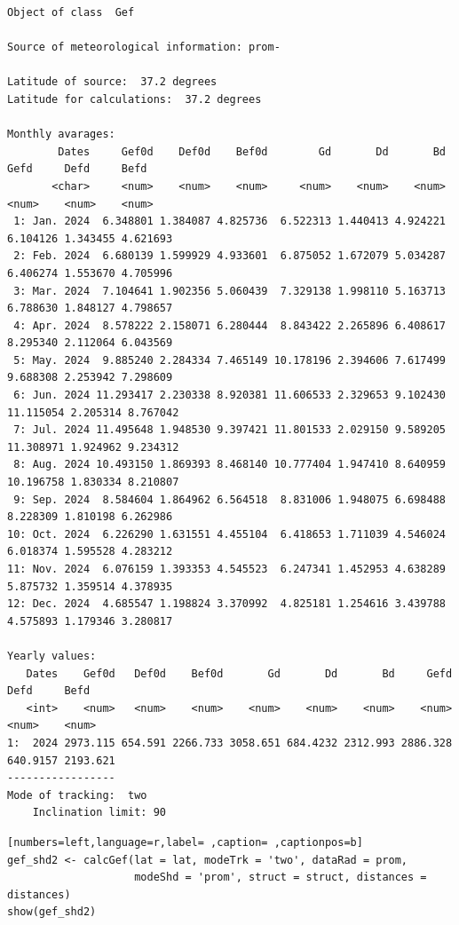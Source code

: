 \begin{verbatim}
Object of class  Gef 

Source of meteorological information: prom- 

Latitude of source:  37.2 degrees
Latitude for calculations:  37.2 degrees

Monthly avarages:
        Dates     Gef0d    Def0d    Bef0d        Gd       Dd       Bd      Gefd     Defd     Befd
       <char>     <num>    <num>    <num>     <num>    <num>    <num>     <num>    <num>    <num>
 1: Jan. 2024  6.348801 1.384087 4.825736  6.522313 1.440413 4.924221  6.104126 1.343455 4.621693
 2: Feb. 2024  6.680139 1.599929 4.933601  6.875052 1.672079 5.034287  6.406274 1.553670 4.705996
 3: Mar. 2024  7.104641 1.902356 5.060439  7.329138 1.998110 5.163713  6.788630 1.848127 4.798657
 4: Apr. 2024  8.578222 2.158071 6.280444  8.843422 2.265896 6.408617  8.295340 2.112064 6.043569
 5: May. 2024  9.885240 2.284334 7.465149 10.178196 2.394606 7.617499  9.688308 2.253942 7.298609
 6: Jun. 2024 11.293417 2.230338 8.920381 11.606533 2.329653 9.102430 11.115054 2.205314 8.767042
 7: Jul. 2024 11.495648 1.948530 9.397421 11.801533 2.029150 9.589205 11.308971 1.924962 9.234312
 8: Aug. 2024 10.493150 1.869393 8.468140 10.777404 1.947410 8.640959 10.196758 1.830334 8.210807
 9: Sep. 2024  8.584604 1.864962 6.564518  8.831006 1.948075 6.698488  8.228309 1.810198 6.262986
10: Oct. 2024  6.226290 1.631551 4.455104  6.418653 1.711039 4.546024  6.018374 1.595528 4.283212
11: Nov. 2024  6.076159 1.393353 4.545523  6.247341 1.452953 4.638289  5.875732 1.359514 4.378935
12: Dec. 2024  4.685547 1.198824 3.370992  4.825181 1.254616 3.439788  4.575893 1.179346 3.280817

Yearly values:
   Dates    Gef0d   Def0d    Bef0d       Gd       Dd       Bd     Gefd     Defd     Befd
   <int>    <num>   <num>    <num>    <num>    <num>    <num>    <num>    <num>    <num>
1:  2024 2973.115 654.591 2266.733 3058.651 684.4232 2312.993 2886.328 640.9157 2193.621
-----------------
Mode of tracking:  two 
    Inclination limit: 90
\end{verbatim}

\begin{lstlisting}[numbers=left,language=r,label= ,caption= ,captionpos=b]
gef_shd2 <- calcGef(lat = lat, modeTrk = 'two', dataRad = prom,
                    modeShd = 'prom', struct = struct, distances = distances)
show(gef_shd2)
\end{lstlisting}

